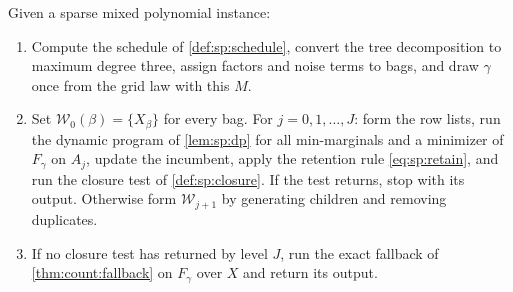 \begin{definition}\label{def:sp:algorithm}
Given a sparse mixed polynomial instance:
\begin{enumerate}[label=(\arabic*)]
\item Compute the schedule of \cref{def:sp:schedule}, convert the tree
decomposition to maximum degree three, assign factors and noise terms to
bags, and draw $\gamma$ once from the grid law with this $M$.
\item Set $\mathcal W_0(\beta)=\{X_\beta\}$ for every bag. For
$j=0,1,\ldots,J$: form the row lists, run the dynamic program of
\cref{lem:sp:dp} for all min-marginals and a minimizer of $F_\gamma$ on
$A_j$, update the incumbent, apply the retention rule \eqref{eq:sp:retain},
and run the closure test of \cref{def:sp:closure}. If the test returns, stop
with its output. Otherwise form $\mathcal W_{j+1}$ by generating children and
removing duplicates.
\item If no closure test has returned by level $J$, run the exact fallback of
\cref{thm:count:fallback} on $F_\gamma$ over $X$ and return its output.
\end{enumerate}
\end{definition}

